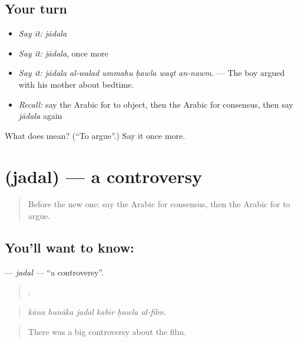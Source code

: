 \subsection*{Your turn}
\begin{itemize}
\raggedright
  \item \emph{Say it:} \emph{jādala}
  \item \emph{Say it:} \emph{jādala}, once more
  \item \emph{Say it:} \emph{jādala al-walad ummahu ḥawla waqt an-nawm.} — The boy argued with his mother about bedtime.
  \item \emph{Recall:} say the Arabic for to object, then the Arabic for consensus, then say \emph{jādala} again
\end{itemize}

\begin{tcolorbox}[breakable,colback=teal!4,colframe=teal!35!black,title={Before you move on}]
What does  mean? (\textquotedblleft{}To argue\textquotedblright{}.) Say it once more.
\end{tcolorbox}
\section[\texorpdfstring{\ar{جدل} (jadal)}{جدل (jadal)}]{ (jadal) — a controversy}

\label{lesson:AR-C360-jadal}



\begin{quote}
Before the new one: say the Arabic for consensus, then the Arabic for to argue.
\end{quote}

\subsection*{You'll want to know: }
\textbf{} — \emph{jadal} — \textquotedblleft{}a controversy\textquotedblright{}.

\begin{quote}
     .
\end{quote}

\begin{quote}
\emph{kāna hunāka jadal kabīr ḥawla al-film.}
\end{quote}

\begin{quote}
There was a big controversy about the film.
\end{quote}

